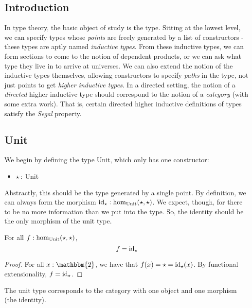 \documentclass[main.tex]{subfiles}
\begin{document}
\subsection{Introduction}
In type theory, the basic object of study is the type. Sitting at the lowest level, we can specify types whose \textit{points} are freely generated by a list of constructors - these types are aptly named \textit{inductive types}. From these inductive types, we can form sections to come to the notion of dependent products, or we can ask what type they live in to arrive at universes. We can also extend the notion of the inductive types themselves, allowing constructors to specify \textit{paths} in the type, not just points to get \textit{higher inductive types}. In a directed setting, the notion of a \textit{directed} higher inductive type should correspond to the notion of a \textit{category} (with some extra work). That is, certain directed higher inductive definitions of types satisfy the \textit{Segal} property.

\subsection{Unit}
We begin by defining the type Unit, which only has one constructor:
\begin{itemize}
    \item $\star\,: \ $Unit
\end{itemize}
Abstractly, this should be the type generated by a single point. By definition, we can always form the morphism $\id{\star} : \ho[\text{Unit}]{\star}{\star}$. We expect, though, for there to be no more information than we put into the type. So, the identity should be the only morphism of the unit type.
\begin{lemma} For all $ \normalfont f : \ho[\text{Unit}]{\star}{\star}$,
\[ f = \id{\star}\]
\end{lemma}
\begin{proof}
For all $x : \mathbbm{2}$, we have that $f(x) = \star = \id{\star}(x)$. By functional extensionality, $f = \id{\star}$.
\end{proof}
The unit type corresponds to the category with one object and one morphism (the identity).
\end{document}
